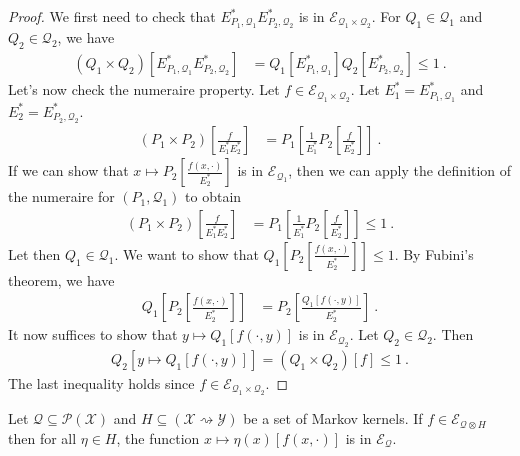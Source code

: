 \begin{proof}\leanok
We first need to check that $E^*_{P_1, \mathcal{Q}_1} E^*_{P_2, \mathcal{Q}_2}$ is in $\mathcal{E}_{\mathcal{Q}_1 \times \mathcal{Q}_2}$. For $Q_1 \in \mathcal{Q}_1$ and $Q_2 \in \mathcal{Q}_2$, we have
\begin{align*}
  (Q_1 \times Q_2)\left[E^*_{P_1, \mathcal{Q}_1} E^*_{P_2, \mathcal{Q}_2}\right]
  &= Q_1[E^*_{P_1, \mathcal{Q}_1}] Q_2[E^*_{P_2, \mathcal{Q}_2}]
  \le 1
  \: .
\end{align*}
Let's now check the numeraire property.
Let $f \in \mathcal{E}_{\mathcal{Q}_1 \times \mathcal{Q}_2}$. Let $E^*_1 = E^*_{P_1, \mathcal{Q}_1}$ and $E^*_2 = E^*_{P_2, \mathcal{Q}_2}$.
\begin{align*}
  (P_1 \times P_2)\left[\frac{f}{E^*_1 E^*_2} \right]
  &= P_1\left[\frac{1}{E_1^*}P_2\left[\frac{f}{E^*_2}\right] \right]
  \: .
\end{align*}
If we can show that $x \mapsto P_2\left[\frac{f(x, \cdot)}{E^*_2}\right]$ is in $\mathcal{E}_{\mathcal{Q}_1}$, then we can apply the definition of the numeraire for $(P_1, \mathcal{Q}_1)$ to obtain
\begin{align*}
  (P_1 \times P_2)\left[\frac{f}{E^*_1 E^*_2} \right]
  &= P_1\left[\frac{1}{E_1^*}P_2\left[\frac{f}{E^*_2}\right] \right]
  \le 1
  \: .
\end{align*}
Let then $Q_1 \in \mathcal{Q}_1$. We want to show that $Q_1 \left[P_2\left[\frac{f(x, \cdot)}{E^*_2}\right]\right] \le 1$.
By Fubini's theorem, we have
\begin{align*}
  Q_1 \left[P_2\left[\frac{f(x, \cdot)}{E^*_2}\right]\right]
  &= P_2\left[\frac{Q_1 \left[f(\cdot, y)\right]}{E^*_2}\right]
  \: .
\end{align*}
It now suffices to show that $y \mapsto Q_1 \left[f(\cdot, y)\right]$ is in $\mathcal{E}_{\mathcal{Q}_2}$.
Let $Q_2 \in \mathcal{Q}_2$. Then
\begin{align*}
  Q_2\left[y \mapsto Q_1 \left[f(\cdot, y)\right]\right]
  = (Q_1 \times Q_2)\left[f\right]
  \le 1
  \: .
\end{align*}
The last inequality holds since $f \in \mathcal{E}_{\mathcal{Q}_1 \times \mathcal{Q}_2}$.
\end{proof}


\begin{lemma}\label{lem:eVar_integral_kernel}
Let $\mathcal{Q} \subseteq \mathcal{P}(\mathcal{X})$ and $H \subseteq (\mathcal{X} \rightsquigarrow \mathcal{Y})$ be a set of Markov kernels.
If $f \in \mathcal{E}_{\mathcal{Q}\otimes H}$ then for all $\eta \in H$, the function $x \mapsto \eta(x)[f(x, \cdot)]$ is in $\mathcal{E}_{\mathcal{Q}}$.
\end{lemma}

